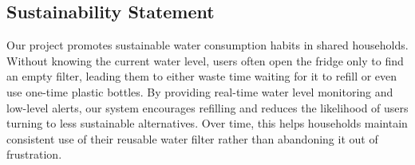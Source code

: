 \subsection{Sustainability Statement}

Our project promotes sustainable water consumption habits in shared households. Without knowing the current water level, users often open the fridge only to find an empty filter, leading them to either waste time waiting for it to refill or even use one-time plastic bottles. By providing real-time water level monitoring and low-level alerts, our system encourages refilling and reduces the likelihood of users turning to less sustainable alternatives. Over time, this helps households maintain consistent use of their reusable water filter rather than abandoning it out of frustration.